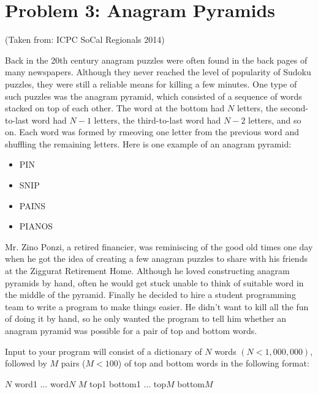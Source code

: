 \normalfont\documentclass[letterpaper,11pt]{article}
\begin{document}
\newpage

\section*{Problem 3: Anagram Pyramids}
(Taken from: ICPC SoCal Regionals 2014)

Back in the 20th century anagram puzzles were often found in the back pages of many newspapers. Although they never reached the level of popularity of Sudoku puzzles, they were still a reliable means for killing a few minutes. One type of such puzzles was the anagram pyramid, which consisted of a sequence of words stacked on top of each other. The word at the bottom had $N$ letters, the second-to-last word had $N - 1$ letters, the third-to-last word had $N - 2$ letters, and so on. Each word was formed by rmeoving one letter from the previous word and shuffling the remaining letters. Here is one example of an anagram pyramid:

\begin{itemize}
\item PIN
\item SNIP
\item PAINS
\item PIANOS
\end{itemize}

Mr. Zino Ponzi, a retired financier, was reminiscing of the good old times one day when he got the idea of creating a few anagram puzzles to share with his friends at the Ziggurat Retirement Home. Although he loved constructing anagram pyramids by hand, often he would get stuck unable to think of suitable word in the middle of the pyramid. Finally he decided to hire a student programming team to write a program to make things easier. He didn't want to kill all the fun of doing it by hand, so he only wanted the program to tell him whether an anagram pyramid was possible for a pair of top and bottom words.

Input to your program will consist of a dictionary of $N$ words $(N < 1,000,000)$, followed by $M$ pairs ($M < 100$) of top and bottom words in the following format:

$N$ \newline
word1 \newline
$\ldots$ \newline
word$N$ \newline
$M$ \newline
top1 bottom1 \newline
$\ldots$ \newline
top$M$ bottom$M$
\end{document}
